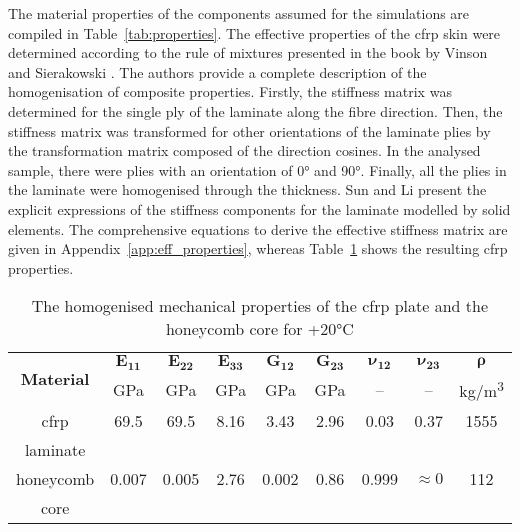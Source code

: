 The material properties of the components assumed for the simulations are compiled in Table~\ref{tab:properties}.
The effective properties of the \ac{cfrp} skin were determined according to the rule of mixtures presented in the book by Vinson and Sierakowski \cite{vinson1993behavior}.
The authors provide a complete description of the homogenisation of composite properties.
Firstly, the stiffness matrix was determined for the single ply of the laminate along the fibre direction.
Then, the stiffness matrix was transformed for other orientations of the laminate plies by the transformation matrix composed of the direction cosines.
In the analysed sample, there were plies with an orientation of \ang{0} and \ang{90}.
Finally, all the plies in the laminate were homogenised through the thickness.
Sun and Li \cite{sun1988three} present the explicit expressions of the stiffness components for the laminate modelled by solid elements.
The comprehensive equations to derive the effective stiffness matrix are given in Appendix~\ref{app:eff_properties}, whereas Table~\ref{tab:properties_eff} shows the resulting \ac{cfrp} properties.
\begin{table}[H]
	\centering
	\small
	\tabcolsep=0.25cm
	\caption{\label{tab:properties_eff} The homogenised mechanical properties of the \acs{cfrp} plate and the honeycomb core for +20\unit{\degreeCelsius}}
	\begin{tabular}{ccccccccc}
		\toprule
		\multirow{2}{*}{\textbf{Material}} & \(\boldsymbol{E_{11}}\) & \(\boldsymbol{E_{22}}\) & \(\boldsymbol{E_{33}}\) & \(\boldsymbol{G_{12}}\) & \(\boldsymbol{G_{23}}\) & \(\boldsymbol{\nu_{12}}\)	& \(\boldsymbol{\nu_{23}}\) & \(\boldsymbol{\rho}\) \\
		& \unit{\giga\pascal} & \unit{\giga\pascal} & \unit{\giga\pascal} & \unit{\giga\pascal} & \unit{\giga\pascal} & -- & -- & \unit[per-mode = symbol]
		{\kilogram\per\cubic\metre}\\
		\midrule
		\ac{cfrp} & 69.5 & 69.5 & 8.16 & 3.43 & 2.96 & 0.03 & 0.37 & 1555\\
		laminate & & & & & & & &\\
		\midrule
		honeycomb & 0.007 & 0.005 & 2.76 & 0.002 & 0.86 & 0.999 & \(\approx0\) & 112\\
		core & & & & & & & &\\
		\bottomrule
	\end{tabular}
\end{table}
%